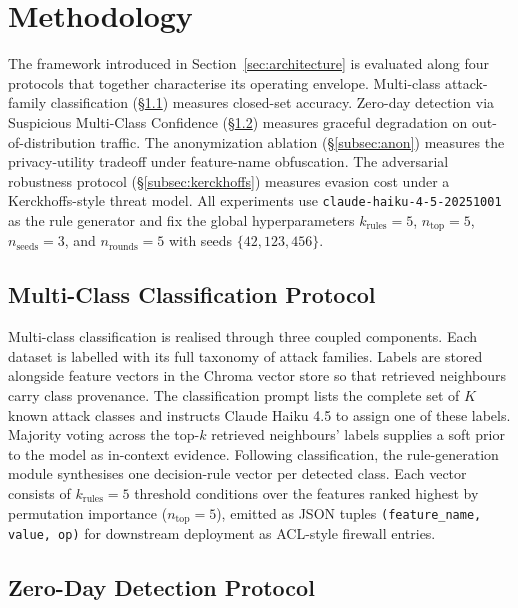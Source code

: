\section{Methodology}
\label{sec:methodology}

The framework introduced in Section~\ref{sec:architecture} is evaluated along
four protocols that together characterise its operating envelope. Multi-class
attack-family classification (\S\ref{subsec:multiclass}) measures closed-set
accuracy. Zero-day detection via Suspicious Multi-Class Confidence
(\S\ref{subsec:zeroday}) measures graceful degradation on out-of-distribution
traffic. The anonymization ablation (\S\ref{subsec:anon}) measures the
privacy-utility tradeoff under feature-name obfuscation. The adversarial
robustness protocol (\S\ref{subsec:kerckhoffs}) measures evasion cost under a
Kerckhoffs-style threat model. All experiments use
\texttt{claude-haiku-4-5-20251001} as the rule generator and fix the global
hyperparameters $k_{\text{rules}}=5$, $n_{\text{top}}=5$, $n_{\text{seeds}}=3$,
and $n_{\text{rounds}}=5$ with seeds $\{42, 123, 456\}$.

\subsection{Multi-Class Classification Protocol}
\label{subsec:multiclass}

Multi-class classification is realised through three coupled components. Each
dataset is labelled with its full taxonomy of attack families. Labels are
stored alongside feature vectors in the Chroma vector store so that retrieved
neighbours carry class provenance. The classification prompt lists the
complete set of $K$ known attack classes and instructs Claude Haiku 4.5 to
assign one of these labels. Majority voting across the top-$k$ retrieved
neighbours' labels supplies a soft prior to the model as in-context evidence.
Following classification, the rule-generation module synthesises one
decision-rule vector per detected class. Each vector consists of
$k_{\text{rules}}=5$ threshold conditions over the features ranked highest by
permutation importance ($n_{\text{top}}=5$), emitted as JSON tuples
\texttt{(feature\_name, value, op)} for downstream deployment as ACL-style
firewall entries.

\subsection{Zero-Day Detection Protocol}
\label{subsec:zeroday}


